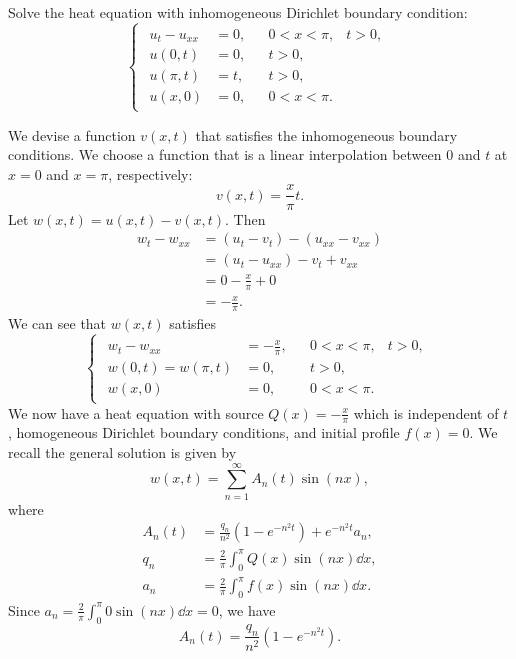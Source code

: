 \documentclass[plain]{pset}
\begin{document}
\begin{problem}
Solve the heat equation with inhomogeneous Dirichlet boundary condition:
\[
    \begin{cases}
        \begin{aligned}
            u_t - u_{xx} & = 0, &  & 0 < x < \pi, & t > 0, \\
            u(0, t)      & = 0, &  & t > 0,                \\
            u(\pi, t)    & = t, &  & t > 0,                \\
            u(x, 0)      & = 0, &  & 0 < x < \pi.
        \end{aligned}
    \end{cases}
\]
\end{problem}
\begin{solution}
    We devise a function \(v(x,t)\) that satisfies the inhomogeneous boundary conditions. We choose a function that is a linear interpolation between \(0\) and \(t\) at \(x = 0\) and \(x = \pi\), respectively:
    \[v(x,t) = \frac{x}{\pi}t.\]
    Let \(w(x,t) = u(x,t) - v(x,t)\). Then
    \begin{align*}
        w_t - w_{xx} & = (u_t - v_t) - (u_{xx} - v_{xx}) \\
                     & = (u_t - u_{xx}) - v_t + v_{xx}   \\
                     & = 0 - \frac{x}{\pi} + 0           \\
                     & = -\frac{x}{\pi}.
    \end{align*}
    We can see that \(w(x,t)\) satisfies
    \[
        \begin{cases}
            \begin{aligned}
                w_t - w_{xx}        & = -\frac{x}{\pi}, &  & 0 < x < \pi, & t > 0, \\
                w(0, t) = w(\pi, t) & = 0,              &  & t > 0,                \\
                w(x, 0)             & = 0,              &  & 0 < x < \pi.
            \end{aligned}
        \end{cases}
    \]
    We now have a heat equation with source \(Q(x) = -\frac{x}{\pi}\) which is independent of \(t\), homogeneous Dirichlet boundary conditions, and initial profile \(f(x) = 0\). We recall the general solution is given by
    \[w(x,t) = \sum_{n=1}^\infty A_n(t)\sin(nx),\]
    where
    \begin{align*}
        A_n(t) & = \frac{q_n}{n^2}\left(1 - e^{-n^2t}\right) + e^{-n^2t}a_n, \\
        q_n    & = \frac{2}{\pi}\int_0^\pi Q(x)\sin(nx) \dd{x},              \\
        a_n    & = \frac{2}{\pi}\int_0^\pi f(x)\sin(nx) \dd{x}.
    \end{align*}
    Since \(a_n = \frac{2}{\pi}\int_0^\pi 0\sin(nx) \dd{x} = 0\), we have
    \[A_n(t) = \frac{q_n}{n^2}\left(1 - e^{-n^2t}\right).\]


\end{solution}
\end{document}
